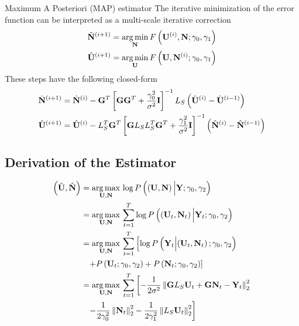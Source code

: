 \documentclass[progressbar=head]{beamer}
\begin{document}
\begin{frame}{Maximum A Posteriori (MAP) estimator}
    The iterative minimization of the error function can be interpreted as a multi-scale iterative correction
    \begin{align}
        \hat{\mathbf{N}}^{(i+1)} &= \operatorname*{arg\,min}_{\mathbf{N}} F\left( \mathbf{U}^{(i)},\mathbf{N}; \gamma_0, \gamma_1 \right)
        \\
        \hat{\mathbf{U}}^{(i+1)} &= \operatorname*{arg\,min}_{\mathbf{U}} F\left( \mathbf{U},\mathbf{N}^{(i)}; \gamma_0, \gamma_1 \right)
    \end{align}
    These steps have the following closed-form
    \begin{align}
        \hat{\mathbf{N}}^{(i+1)} &=
        \hat{\mathbf{N}}^{(i)}
        -
        \mathbf{G}^T \left[ \mathbf{G} \mathbf{G}^T + \frac{\gamma_0^2}{\sigma^2} \mathbf{I} \right]^{-1} L_S \left( \hat{\mathbf{U}}^{(i)}-\hat{\mathbf{U}}^{(i-1)}  \right)
        \\
        \hat{\mathbf{U}}^{(i+1)} &=
        \hat{\mathbf{U}}^{(i)}
        -
        L_S^T \mathbf{G}^T \left[ \mathbf{G} L_S L_S^T \mathbf{G}^T + \frac{\gamma_1^2}{\sigma^2} \mathbf{I} \right]^{-1} \left( \hat{\mathbf{N}}^{(i)}-\hat{\mathbf{N}}^{(i-1)}  \right)
    \end{align}
\end{frame}

{
\subsection{Derivation of the Estimator}
}

\begin{frame}
\begin{align*}
    \left(  \hat{\mathbf{U}}, \hat{\mathbf{N}}  \right) &=
    \operatorname*{arg\,max}_{\mathbf{U}, \mathbf{N} }\,
    \log P\left( \left(  {\mathbf{U}}, {\mathbf{N}}  \right) \Big| {\mathbf{Y}; \gamma_0, \gamma_2}  \right)
    \\
    &=
    \operatorname*{arg\,max}_{\mathbf{U}, \mathbf{N} }\, \sum_{t=1}^T 
    \log P\left( \left(  {\mathbf{U}_t}, {\mathbf{N}_t}  \right) \Big| {\mathbf{Y}_t; \gamma_0, \gamma_2}  \right)
    \\
    &=
    \operatorname*{arg\,max}_{\mathbf{U}, \mathbf{N} }\, \sum_{t=1}^T  \left[
    \log P\left( { \mathbf{Y}_t } \Big| { \left( \mathbf{U}_t, \mathbf{N}_t \right)  ; \gamma_0, \gamma_2}  \right)
    \right.
    \\
    &\phantom{=}
    \left.
    +
    P\left( { {\mathbf{U}_t}  ; \gamma_0, \gamma_2}  \right)
    +
    P\left( { {\mathbf{N}_t}  ; \gamma_0, \gamma_2}  \right)
    \right]
    \\
    &=
    \operatorname*{arg\,max}_{\mathbf{U}, \mathbf{N} }\, \sum_{t=1}^T  \left[
    -\frac{1}{2\sigma^2}
    \left\lVert \mathbf{G} L_S \mathbf{U}_t + \mathbf{G} \mathbf{N}_t - \mathbf{Y}_t \right\rVert_2^2
    \right.
    \\
    &\phantom{=}
    \left.
    -
    \frac{1}{2\gamma_0^2} \left\lVert \mathbf{N}_t \right\rVert_2^2
    -
    \frac{1}{2\gamma_1^2} \left\lVert L_S \mathbf{U}_t \right\rVert_2^2
    \right]
\end{align*}
\end{frame}
\end{document}
